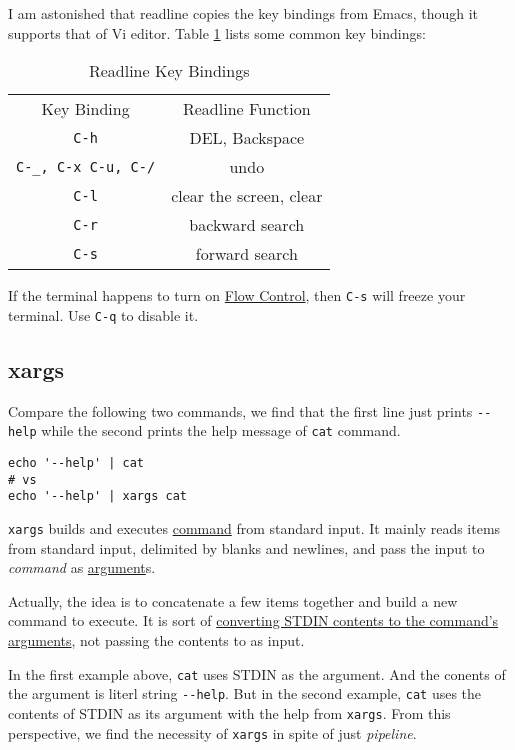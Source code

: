 I am astonished that readline copies the key bindings from Emacs,
though it supports that of Vi editor. Table
\ref{tab:readline-bindings} lists some common key bindings:

\begin{table}[tbp]
  \centering
  \begin{tabular}{c|c}
    \hline{}
    Key Binding & Readline Function \\
    \verb|C-h| & DEL, Backspace \\
    \verb|C-_, C-x C-u, C-/| & undo \\
    \verb|C-l| & clear the screen, clear \\
    \verb|C-r| & backward search \\
    \verb|C-s| & forward search
  \end{tabular}
  \caption{Readline Key Bindings}
  \label{tab:readline-bindings}
\end{table}

If the terminal happens to turn on
\href{https://www.tldp.org/HOWTO/Text-Terminal-HOWTO-11.html}{Flow
  Control}, then \verb|C-s| will freeze your terminal. Use
\verb|C-q| to disable it.

\subsection{xargs}
\label{sec:gnu-xargs}

Compare the following two commands, we find that the first line
just prints \verb|--help| while the second prints the help message
of \lstinline|cat| command.

\begin{lstlisting}
echo '--help' | cat
# vs
echo '--help' | xargs cat
\end{lstlisting}

\lstinline|xargs| builds and executes \uline{command} from
standard input. It mainly reads items from standard input,
delimited by blanks and newlines, and pass the input to
\textit{command} as \uline{argument}s.

Actually, the idea is to concatenate a few items together and build
a new command to execute. It is sort of
\href{https://superuser.com/a/600273/221946}{converting STDIN
  contents to the command's arguments}, not passing the contents
to as input.

In the first example above, \lstinline|cat| uses STDIN as the
argument. And the conents of the argument is literl string
\verb|--help|. But in the second example, \lstinline|cat| uses the
contents of STDIN as its argument with the help from
\lstinline|xargs|. From this perspective, we find the necessity of
\lstinline|xargs| in spite of just \textit{pipeline}.

